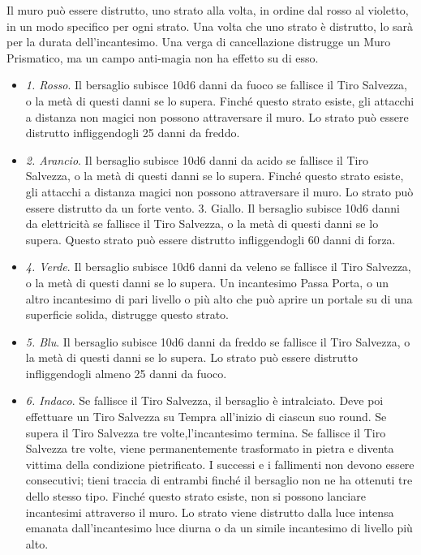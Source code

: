 \begin{multicols}{2}
Il muro può essere distrutto, uno strato alla volta, in ordine dal rosso al violetto, in un modo specifico per ogni strato. Una volta che uno strato è distrutto, lo sarà per la durata dell'incantesimo. Una verga di cancellazione distrugge un Muro Prismatico, ma un campo anti-magia non ha effetto su di esso.

\begin{itemize}[leftmargin=*] \setlength{\itemsep}{0pt}
	\item \emph{1. Rosso}. Il bersaglio subisce 10d6 danni da fuoco se fallisce il Tiro Salvezza, o la metà di questi danni se lo supera. Finché questo strato esiste, gli attacchi a distanza non magici non possono attraversare il muro. Lo strato può essere distrutto infliggendogli 25 danni da freddo.
	\item \emph{2. Arancio}. Il bersaglio subisce 10d6 danni da acido se fallisce il Tiro Salvezza, o la metà di questi danni se lo supera. Finché questo strato esiste, gli attacchi a distanza magici non possono attraversare il muro. Lo strato può essere distrutto da un forte vento. 3. Giallo. Il bersaglio subisce 10d6 danni da elettricità se fallisce il Tiro Salvezza, o la metà di questi danni se lo supera. Questo strato può essere distrutto infliggendogli 60 danni di forza.
	\item \emph{4. Verde}. Il bersaglio subisce 10d6 danni da veleno se fallisce il Tiro Salvezza, o la metà di questi danni se lo supera. Un incantesimo Passa Porta, o un altro incantesimo di pari livello o più alto che può aprire un portale su di una superficie solida, distrugge questo strato.
	\item \emph{5. Blu}. Il bersaglio subisce 10d6 danni da freddo se fallisce il Tiro Salvezza, o la metà di questi danni se lo supera. Lo strato può essere distrutto infliggendogli almeno 25 danni da fuoco.
	\item \emph{6. Indaco}. Se fallisce il Tiro Salvezza, il bersaglio è intralciato. Deve poi effettuare un Tiro Salvezza su Tempra all'inizio di ciascun suo round. Se supera il Tiro Salvezza tre volte,l'incantesimo termina. Se fallisce il Tiro Salvezza tre volte, viene permanentemente trasformato in pietra e diventa vittima della condizione pietrificato. I successi e i fallimenti non devono essere consecutivi; tieni traccia di entrambi finché il bersaglio non ne ha ottenuti tre dello stesso tipo. Finché questo strato esiste, non si possono lanciare incantesimi attraverso il muro. Lo strato viene distrutto dalla luce intensa emanata dall'incantesimo luce diurna o da un simile incantesimo di livello più alto.

\end{itemize}
\end{multicols}
